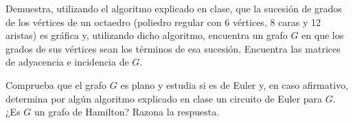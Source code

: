 \begin{ejercicio}\label{ej:1.30}
    Demuestra, utilizando el algoritmo explicado en clase, que la sucesión de grados de los vértices de un octaedro (poliedro regular con 6 vértices, 8 caras y 12 aristas) es gráfica y, utilizando dicho algoritmo, encuentra un grafo $G$ en que los grados de sus vértices sean los términos de esa sucesión. Encuentra las matrices de adyacencia e incidencia de $G$.
    
    Comprueba que el grafo $G$ es plano y estudia si es de Euler y, en caso afirmativo, determina por algún algoritmo explicado en clase un circuito de Euler para $G$. ¿Es $G$ un grafo de Hamilton? Razona la respuesta.

\end{ejercicio}



